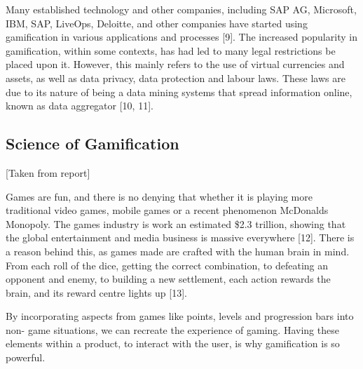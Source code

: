 \documentclass{sigchi}
\begin{document}
Many established technology and other companies, including SAP AG, Microsoft, IBM, SAP, LiveOps, Deloitte, and other companies have started using gamification in various applications and processes [9]. 
The increased popularity in gamification, within some contexts, has had led to many legal restrictions be placed upon it. However, this mainly refers to the use of virtual currencies and assets, as well as data privacy, data protection and labour laws. These laws are due to its nature of being a data mining systems that spread information online, known as data aggregator [10, 11]. 

\subsection{Science of Gamification}
[Taken from report]

Games are fun, and there is no denying that whether it is playing more traditional video games, mobile games or a recent phenomenon McDonalds Monopoly. The games industry is work an estimated \$2.3 trillion, showing that the global entertainment and media business is massive everywhere [12]. There is a reason behind this, as games made are crafted with the human brain in mind. From each roll of the dice, getting the correct combination, to defeating an opponent and enemy, to building a new settlement, each action rewards the brain, and its reward centre lights up [13]. 

By incorporating aspects from games like points, levels and progression bars into non- game situations, we can recreate the experience of gaming. Having these elements within a product, to interact with the user, is why gamification is so powerful. 
\end{document}

